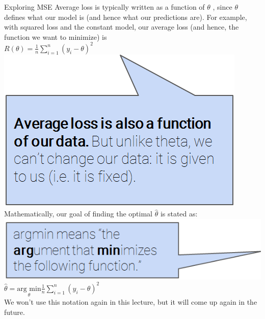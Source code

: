\documentclass[aspectratio=169]{../latex_main/tntbeamer}  %
\begin{document}
	\begin{frame}{Exploring MSE}
	    Average loss is typically written as a function of  $\theta$  , since  $\theta$   defines what our model is (and hence what our predictions are). For example, with squared loss and the constant model, our average loss (and hence, the function we want to minimize) is\\
	  
	    \hspace{5cm} $R(\theta) = \frac{1}{n}\sum\limits_{i=1}^n(y_i - \theta)^2$\\
	    \vspace{-1.3cm}
	    \hspace{10cm} \includegraphics[scale=.3]{Bild23}\\
	    
	     Mathematically, our goal of finding the optimal   $\hat{\theta}$  is stated as:\\
	    \vspace{.5cm}
	    \hspace{.3cm}
	    \includegraphics[scale=.35]{Bild24}\\
	    
	    \vspace{-1.3cm}
	    \hspace{4.5cm} $\hat{\theta} = \underset{\theta}{\text{arg min}} \frac{1}{n}\sum\limits_{i=1}^n(y_i - \theta)^2$\\
	    \vspace{0.5cm}
	    We won’t use this notation again in this lecture, but it will come up again in the future.\\
	\end{frame}
	
\end{document}
